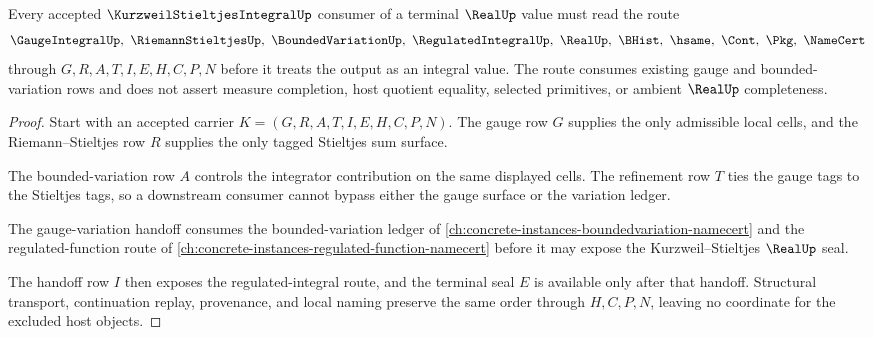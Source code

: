 \begin{theorem}
\label{thm:kurzweil-stieltjes-integral-gauge-variation-handoff}
Every accepted $\KurzweilStieltjesIntegralUp$ consumer of a terminal $\RealUp$ value must read the route
$$
\GaugeIntegralUp,\ \RiemannStieltjesUp,\ \BoundedVariationUp,\ \RegulatedIntegralUp,\ \RealUp,\ \BHist,\ \hsame,\ \Cont,\ \Pkg,\ \NameCert
$$
through $G,R,A,T,I,E,H,C,P,N$ before it treats the output as an integral value. The route consumes existing gauge and bounded-variation rows and does not assert measure completion, host quotient equality, selected primitives, or ambient $\RealUp$ completeness.
\end{theorem}
\begin{proof}
Start with an accepted carrier $K=(G,R,A,T,I,E,H,C,P,N)$. The gauge row $G$ supplies the only admissible local cells, and the Riemann--Stieltjes row $R$ supplies the only tagged Stieltjes sum surface.

The bounded-variation row $A$ controls the integrator contribution on the same displayed cells. The refinement row $T$ ties the gauge tags to the Stieltjes tags, so a downstream consumer cannot bypass either the gauge surface or the variation ledger.

The gauge-variation handoff consumes the bounded-variation ledger of \autoref{ch:concrete-instances-boundedvariation-namecert} and the regulated-function route of \autoref{ch:concrete-instances-regulated-function-namecert} before it may expose the Kurzweil--Stieltjes $\RealUp$ seal.

The handoff row $I$ then exposes the regulated-integral route, and the terminal seal $E$ is available only after that handoff. Structural transport, continuation replay, provenance, and local naming preserve the same order through $H,C,P,N$, leaving no coordinate for the excluded host objects.
\end{proof}



